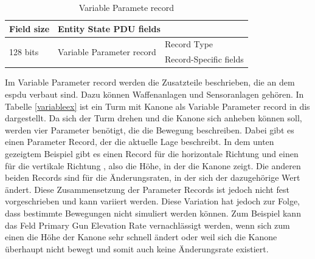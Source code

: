 \begin{table}[H]
	\centering
	\begin{tabular}{|l|l|l|}
		\hline
		Field size                & \multicolumn{2}{l|}{Entity State PDU fields}                        \\ \hline
		\multirow{2}{*}{128 bits} & \multirow{2}{*}{Variable Parameter record} & Record Type            \\ \cline{3-3} 
		&                                            & Record-Specific fields \\ \hline
	\end{tabular}
\caption[Variable Parameter record ]{Variable Paramete record\cite{SISOStandardsActivityCommitteeoftheIEEEComputerSociety.}}
\label{variable}
\end{table}
Im Variable Parameter record werden die Zusatzteile beschrieben, die an dem \ac{espdu} verbaut sind. Dazu können Waffenanlagen und Sensoranlagen gehören. In Tabelle \ref{variableex} ist ein Turm mit Kanone als  Variable Parameter record in \ac{dis} dargestellt. Da sich der Turm drehen und die Kanone sich anheben können soll, werden vier Parameter benötigt, die die Bewegung beschreiben. Dabei gibt es einen Parameter Record, der die aktuelle Lage beschreibt. In dem unten gezeigtem Beispiel gibt es einen  Record für die horizontale Richtung und einen für die vertikale Richtung , also die Höhe, in der die Kanone zeigt. Die anderen beiden Records sind für die Änderungsraten, in der sich der dazugehörige Wert ändert. Diese Zusammensetzung der Parameter Records ist jedoch nicht fest vorgeschrieben und kann variiert werden. Diese Variation hat jedoch zur Folge, dass bestimmte Bewegungen nicht simuliert werden können. Zum Beispiel kann das Feld \glqq Primary Gun Elevation Rate\grqq{}  vernachlässigt werden, wenn sich zum einen die Höhe der Kanone sehr schnell ändert oder weil sich die Kanone überhaupt nicht bewegt und somit auch keine Änderungsrate existiert.  \\
\cite{SISOStandardsActivityCommitteeoftheIEEEComputerSociety.}
\cite{Shanks.}  
\cite{SISOStandardsActivityCommitteeoftheIEEEComputerSociety.6November2015}
